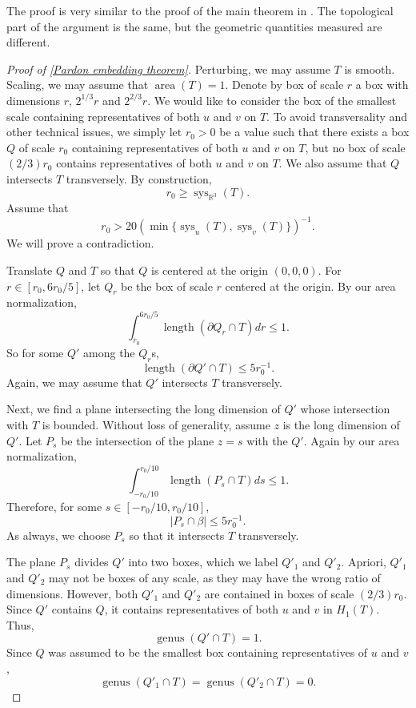 \documentclass[12pt]{amsart}
\DeclareMathOperator*{\Area}{area}
\DeclareMathOperator*{\length}{length}
\DeclareMathOperator*{\sys}{sys}
\DeclareMathOperator*{\genus}{genus}
\theoremstyle{definition}
\begin{document}
The proof is very similar to the proof of the main theorem in \cite{Par11}. The topological part of the argument is the same, but the geometric quantities measured are different.

\begin{proof}[Proof of \cref{Pardon embedding theorem}]
Perturbing, we may assume $T$ is smooth. Scaling, we may assume that $\Area(T)=1$. Denote by box of scale $r$ a box with dimensions $r$, $2^{1/3}r$ and $2^{2/3}r$. We would like to consider the box of the smallest scale containing representatives of both $u$ and $v$ on $T$. To avoid transversality and other technical issues, we simply let $r_0>0$ be a value such that there exists a box $Q$ of scale $r_0$ containing representatives of both $u$ and $v$ on $T$, but no box of scale $(2/3)r_0$ contains representatives of both $u$ and $v$ on $T$. We also assume that $Q$ intersects $T$ transversely. By construction, $$r_0\geq \textstyle \sys_{\mathbb{R}^3} (T).$$ Assume that $$r_0>20\textstyle(\min\{\sys_u(T),\sys_v(T)\})^{-1}.$$ We will prove a contradiction.

Translate $Q$ and $T$ so that $Q$ is centered at the origin $(0,0,0)$. For $r\in [r_0,6r_0/5]$, let $Q_r$ be the box of scale $r$ centered at the origin. By our area normalization, $$\int_{r_0}^{6r_0/5}\length(\partial Q_{r}\cap T)dr\leq 1.$$ So for some $Q'$ among the $Q_r$s, $$\length(\partial Q'\cap T)\leq 5r_0^{-1}.$$ Again, we may assume that $Q'$ intersects $T$ transversely.

Next, we find a plane intersecting the long dimension of $Q'$ whose intersection with $T$ is bounded. Without loss of generality, assume $z$ is the long dimension of $Q'$. Let $P_s$ be the intersection of the plane $z=s$ with the $Q'$. Again by our area normalization,
$$ \int_{-r_0/10}^{r_0/10}\length(P_s\cap T)ds\leq 1.$$ Therefore, for some $s\in [-r_0/10,r_0/10]$, $$|P_s\cap \beta|\leq 5r_0^{-1}.$$ As always, we choose $P_s$ so that it intersects $T$ transversely.

The plane $P_s$ divides $Q'$ into two boxes, which we label $Q'_1$ and $Q'_2$. Apriori, $Q'_1$ and $Q'_2$ may not be boxes of any scale, as they may have the wrong ratio of dimensions. However, both $Q'_1$ and $Q'_2$ are contained in boxes of scale $(2/3)r_0$. Since $Q'$ contains $Q$, it contains representatives of both $u$ and $v$ in $H_1(T)$. Thus, $$\genus(Q'\cap T)=1.$$ Since $Q$ was assumed to be the smallest box containing representatives of $u$ and $v$, $$\genus(Q'_1\cap T)=\genus(Q'_2\cap T)=0.$$


\end{proof}
\end{document}
